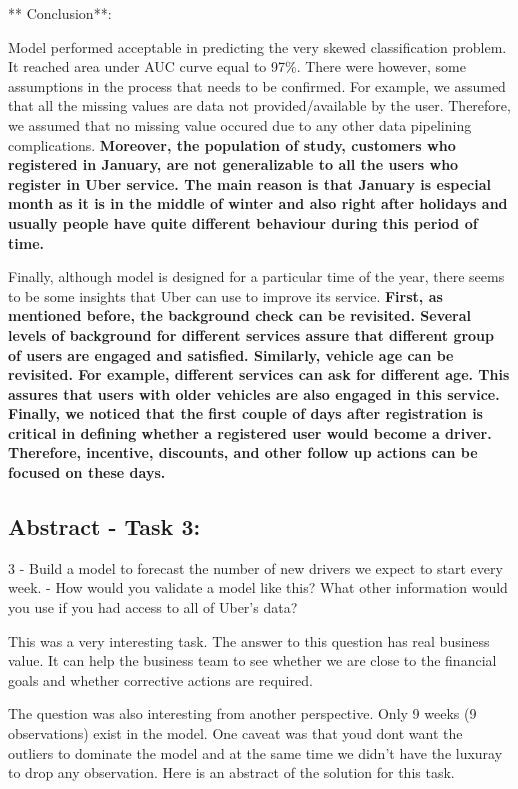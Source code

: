 \documentclass[11pt]{article}
\begin{document}
** Conclusion**:

Model performed acceptable in predicting the very skewed classification
problem. It reached area under AUC curve equal to 97\%. There were
however, some assumptions in the process that needs to be confirmed. For
example, we assumed that all the missing values are data not
provided/available by the user. Therefore, we assumed that no missing
value occured due to any other data pipelining complications.
\textbf{Moreover, the population of study, customers who registered in
January, are not generalizable to all the users who register in Uber
service. The main reason is that January is especial month as it is in
the middle of winter and also right after holidays and usually people
have quite different behaviour during this period of time.}

Finally, although model is designed for a particular time of the year,
there seems to be some insights that Uber can use to improve its
service. \textbf{First, as mentioned before, the background check can be
revisited. Several levels of background for different services assure
that different group of users are engaged and satisfied. Similarly,
vehicle age can be revisited. For example, different services can ask
for different age. This assures that users with older vehicles are also
engaged in this service. Finally, we noticed that the first couple of
days after registration is critical in defining whether a registered
user would become a driver. Therefore, incentive, discounts, and other
follow up actions can be focused on these days.}

    \subsection{Abstract - Task 3:}\label{abstract---task-3}

3 - Build a model to forecast the number of new drivers we expect to
start every week. - How would you validate a model like this? What other
information would you use if you had access to all of Uber's data?

This was a very interesting task. The answer to this question has real
business value. It can help the business team to see whether we are
close to the financial goals and whether corrective actions are
required.

The question was also interesting from another perspective. Only 9 weeks
(9 observations) exist in the model. One caveat was that youd dont want
the outliers to dominate the model and at the same time we didn't have
the luxuray to drop any observation. Here is an abstract of the solution
for this task.
\end{document}
